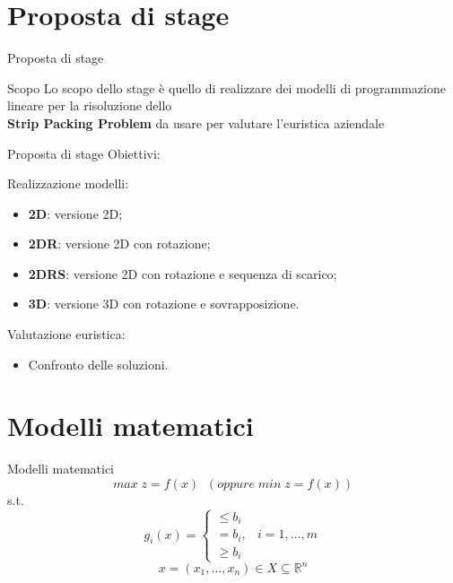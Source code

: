\documentclass{beamer}
\begin{document}
\section{Proposta di stage}

\begin{frame}{Proposta di stage}
	\begin{alertblock}{Scopo}
		Lo scopo dello stage \`e  quello di realizzare dei modelli di programmazione lineare per la risoluzione dello \\ \textbf{Strip Packing Problem} da usare per valutare l'euristica aziendale
	\end{alertblock}
\end{frame}

\begin{frame}{Proposta di stage}
	\large{Obiettivi:}
	\begin{alertblock}{Realizzazione modelli:}
		\begin{itemize}
			\item \textbf{2D}: versione 2D;
			\item \textbf{2DR}: versione 2D con rotazione;
			\item \textbf{2DRS}: versione 2D con rotazione e sequenza di scarico;
			\item \textbf{3D}: versione 3D con rotazione e sovrapposizione.
		\end{itemize}
	\end{alertblock}
	\begin{alertblock}{Valutazione euristica:}
		\begin{itemize}
			\item Confronto delle soluzioni.
		\end{itemize}
	\end{alertblock}
\end{frame}
	
\section{Modelli matematici}
\begin{frame}{Modelli matematici}
	$$ max\; z = f ( x )\;\; (oppure\; min\; z = f ( x ))$$
	s.t.
	$$g_i (x) = \begin{cases} \leq b_i \\ = b_i, & i = 1,\dots,m \\ \geq b_i \end{cases}$$
	$$x = (x_1,\dots,x_n) \in X \subseteq \mathbb{R}^n$$
\end{frame}
\end{document}
